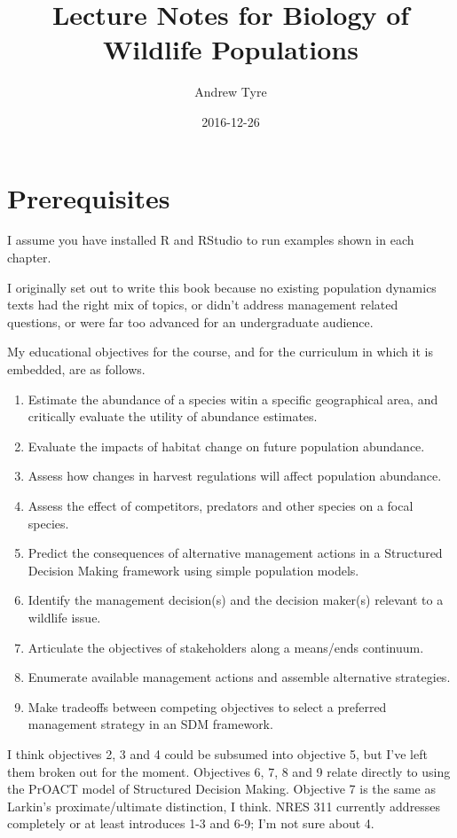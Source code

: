 \documentclass[]{book}
\title{Lecture Notes for Biology of Wildlife Populations}
\author{Andrew Tyre}
\date{2016-12-26}
\begin{document}
\maketitle

{
\setcounter{tocdepth}{1}
\tableofcontents
}
\chapter{Prerequisites}\label{prerequisites}

I assume you have installed R and RStudio to run examples shown in each
chapter.

I originally set out to write this book because no existing population
dynamics texts had the right mix of topics, or didn't address management
related questions, or were far too advanced for an undergraduate
audience.

My educational objectives for the course, and for the curriculum in
which it is embedded, are as follows.

\begin{enumerate}
  \item Estimate the abundance of a species witin a specific geographical area, and critically evaluate the utility of abundance estimates.
  \item Evaluate the impacts of habitat change on future population abundance. 
  \item Assess how changes in harvest regulations will affect population abundance.
  \item Assess the effect of competitors, predators and other species on a focal species.
  \item Predict the consequences of alternative management actions in a Structured Decision Making framework using simple population models.
  \item Identify the management decision(s) and the decision maker(s) relevant to a wildlife issue. 
  \item Articulate the objectives of stakeholders along a means/ends continuum.
  \item Enumerate available management actions and assemble alternative strategies.
  \item Make tradeoffs between competing objectives to select a preferred management strategy in an SDM framework.
\end{enumerate}

I think objectives 2, 3 and 4 could be subsumed into objective 5, but
I've left them broken out for the moment. Objectives 6, 7, 8 and 9
relate directly to using the PrOACT model of Structured Decision Making.
Objective 7 is the same as Larkin's proximate/ultimate distinction, I
think. NRES 311 currently addresses completely or at least introduces
1-3 and 6-9; I'm not sure about 4.
\end{document}

